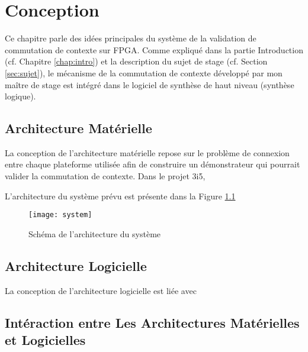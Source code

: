 \chapter{Conception}
\label{chap:concep}
\OnehalfSpacing

Ce chapitre parle des idées principales du système de la validation de commutation de contexte sur FPGA.
Comme expliqué dans la partie Introduction (cf. Chapitre \ref{chap:intro}) et la description du sujet de stage 
(cf. Section \ref{sec:sujet}), le mécanisme de la commutation de contexte développé par mon maître de stage
est intégré dans le logiciel de synthèse de haut niveau (synthèse logique).
 

\section{Architecture Matérielle}
\label{sec:concephard}

La conception de l'architecture matérielle repose sur le problème de connexion entre chaque plateforme
utilisée afin de construire un démonstrateur qui pourrait valider la commutation de contexte.
Dans le projet 3i5, 

L'architecture du système prévu est présente dans la Figure \ref{fig:system}

\begin{figure}[h]
	\label{fig:system}
	\centering
	\texttt{[image: system]}
	\caption{Schéma de l'architecture du système}
	\label{fig:system}
	\vspace{-2mm}
\end{figure}

\section{Architecture Logicielle}
\label{sec:concepsoft}

La conception de l'architecture logicielle est liée avec 

\section[Intéraction entre Les Deux]{Intéraction entre Les Architectures Matérielles et Logicielles}